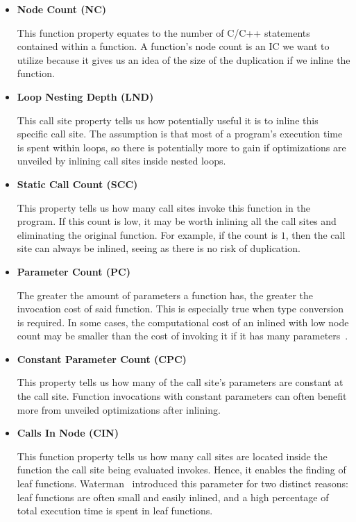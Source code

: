 \begin{itemize}

	\item \textbf{Node Count (NC)}

This function property equates to the number of C/C++ statements contained
within a function. A function's node count is an IC we want to utilize because
it gives us an idea of the size of the  duplication if we inline the function.

	\item \textbf{Loop Nesting Depth (LND)}

This call site property tells us how potentially useful it is to inline this
specific call site. The assumption is that most of a program's execution time is
spent within loops, so there is potentially more to gain if optimizations are
unveiled by inlining call sites inside nested loops.

	\item \textbf{Static Call Count (SCC)}

This property tells us how many call sites invoke this function in the program.
If this count is low, it may be worth inlining all the call sites and
eliminating the original function. For example, if the count is $1$, then the
call site can always be inlined, seeing as there is no risk of  duplication.

	\item \textbf{Parameter Count (PC)}

The greater the amount of parameters a function has, the greater the invocation
cost of said function. This is especially true when type conversion is required.
In some cases, the computational cost of an inlined with low node count may
be smaller than the cost of invoking it if it has many
parameters~\cite{AdaptvCompilAndInlingWaterman}.

	\item \textbf{Constant Parameter Count (CPC)}

This property tells us how many of the call site's parameters are constant at
the call site. Function invocations with constant parameters can often benefit
more from unveiled optimizations after inlining.

	\item \textbf{Calls In Node (CIN)}

This function property tells us how many call sites are located inside the
function the call site being evaluated invokes. Hence, it enables the finding of
leaf functions. Waterman~\cite{AdaptvCompilAndInlingWaterman} introduced this
parameter for two distinct reasons: leaf functions are often small and easily
inlined, and a high percentage of total execution time is spent in leaf
functions.

\end{itemize}

